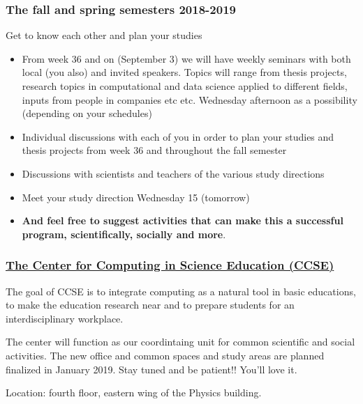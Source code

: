 \documentclass{beamer}
\begin{document}
\begin{frame}
\frametitle{The fall and spring semesters 2018-2019}

Get to know each other and plan your studies
\begin{block}{}
\begin{itemize}
 \item From week 36 and on (September 3) we will have  weekly seminars with both local (you also) and invited speakers. Topics will range from thesis projects, research topics in computational and data science applied to different fields, inputs from people in companies etc etc.  Wednesday afternoon as a possibility (depending on your schedules)

 \item Individual discussions with each of you in order to plan your studies and thesis projects from week 36 and throughout the fall semester

 \item Discussions with scientists and teachers of the various study directions

 \item Meet your study direction Wednesday 15 (tomorrow)

 \item \textbf{And feel free to suggest activities that can make this a successful program, scientifically, socially and more}.
\end{itemize}

\noindent
\end{block}
\end{frame}

\begin{frame}
\frametitle{\href{{https://www.mn.uio.no/ccse/english/}}{The Center for Computing in Science Education (CCSE)}}

\begin{block}{}
The goal of CCSE is to integrate computing as a natural tool in basic educations, to make the education research near and to prepare students for an interdisciplinary workplace.

The center will function as our coordintaing unit for common scientific and social activities. The new office and common spaces and study areas are planned finalized in January 2019. Stay tuned and be patient!! You'll love it. 

Location: fourth floor, eastern wing of the Physics building.
\end{block}
\end{frame}
\end{document}
